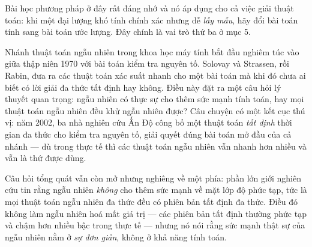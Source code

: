 \documentclass[../../algorithm.tex]{subfiles}
\begin{document}
Bài học phương pháp ở đây rất đáng nhớ và nó áp dụng cho cả việc giải thuật toán: khi một đại lượng khó tính chính xác nhưng dễ \emph{lấy mẫu}, hãy đổi bài toán tính sang bài toán ước lượng. Đây chính là vai trò thứ ba ở mục 5.

Nhánh thuật toán ngẫu nhiên trong khoa học máy tính bắt đầu nghiêm túc vào giữa thập niên 1970 với bài toán kiểm tra nguyên tố. Solovay và Strassen, rồi Rabin, đưa ra các thuật toán xác suất nhanh cho một bài toán mà khi đó chưa ai biết có lời giải đa thức tất định hay không. Điều này đặt ra một câu hỏi lý thuyết quan trọng: ngẫu nhiên có thực sự cho thêm sức mạnh tính toán, hay mọi thuật toán ngẫu nhiên đều khử ngẫu nhiên được? Câu chuyện có một kết cục thú vị: năm 2002, ba nhà nghiên cứu Ấn Độ công bố một thuật toán \emph{tất định} thời gian đa thức cho kiểm tra nguyên tố, giải quyết đúng bài toán mở đầu của cả nhánh --- dù trong thực tế thì các thuật toán ngẫu nhiên vẫn nhanh hơn nhiều và vẫn là thứ được dùng.

Câu hỏi tổng quát vẫn còn mở nhưng nghiêng về một phía: phần lớn giới nghiên cứu tin rằng ngẫu nhiên \emph{không} cho thêm sức mạnh về mặt lớp độ phức tạp, tức là mọi thuật toán ngẫu nhiên đa thức đều có phiên bản tất định đa thức. Điều đó không làm ngẫu nhiên hoá mất giá trị --- các phiên bản tất định thường phức tạp và chậm hơn nhiều bậc trong thực tế --- nhưng nó nói rằng sức mạnh thật sự của ngẫu nhiên nằm ở \emph{sự đơn giản}, không ở khả năng tính toán.

\begin{gocre}
\end{gocre}
\end{document}
